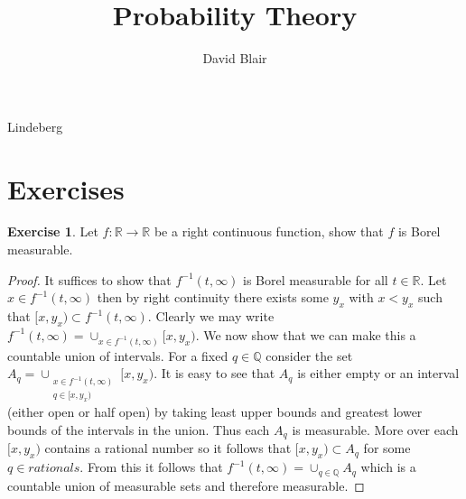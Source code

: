 \documentclass{amsbook}
\theoremstyle{definition}
\newtheorem{xca}{Exercise}
\theoremstyle{remark}
\newcommand{\reals}{\mathbb{R}}
\newcommand{\rationals}{\mathbb{Q}}
\begin{document}
\frontmatter
\title{Probability Theory}
\author{David Blair}
\maketitle

\mainmatter

\tableofcontents











 {Lindeberg}























\section{Exercises}
\begin{xca}Let $f : \reals \to \reals$ be a right continuous function,
  show that $f$ is Borel measurable.
\end{xca}
\begin{proof}
It suffices to show that $f^{-1}(t, \infty)$ is Borel measurable for
all $t \in \reals$.  Let $x \in f^{-1}(t, \infty)$ then by right
continuity there exists some $y_x$ with $x < y_x$ such that $[x,y_x) \subset
f^{-1}(t, \infty)$.  Clearly we may write $f^{-1}(t, \infty) = \cup_{x
  \in f^{-1}(t, \infty)} [x, y_x)$.  We now show that we can make this
a countable union of intervals.  For a fixed $q \in \rationals$
consider the set $A_q = \cup_{\substack{x \in f^{-1}(t, \infty) \\ q
    \in [x, y_x)}} [x, y_x)$.  It is easy to see that $A_q$ is either
empty or an
interval (either open or half open) by taking least upper bounds and
greatest lower bounds of the intervals in the union.  Thus each $A_q$
is measurable.  More over each $[x,y_x)$ contains a rational number so
it follows that $[x,y_x) \subset A_q$ for some $q \in rationals$.
From this it follows that $f^{-1}(t, \infty) = \cup_{q \in
  \rationals}A_q$ which is a countable union of measurable sets and
therefore measurable.
\end{proof}
\end{document}
